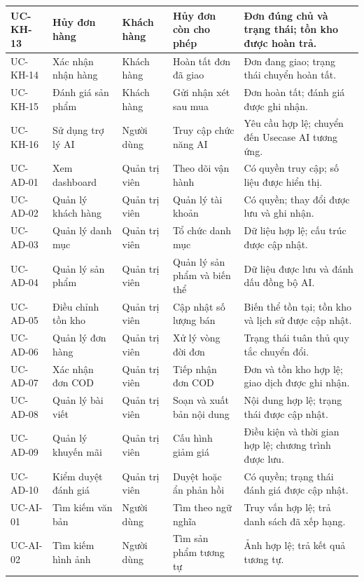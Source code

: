 \begin{longtable}{|p{}|p{}|p{}|p{}|p{}|}
    UC-KH-13 & Hủy đơn hàng & Khách hàng & Hủy đơn còn cho phép & Đơn đúng chủ và trạng thái; tồn kho được hoàn trả. \\ \hline
    UC-KH-14 & Xác nhận nhận hàng & Khách hàng & Hoàn tất đơn đã giao & Đơn đang giao; trạng thái chuyển hoàn tất. \\ \hline
    UC-KH-15 & Đánh giá sản phẩm & Khách hàng & Gửi nhận xét sau mua & Đơn hoàn tất; đánh giá được ghi nhận. \\ \hline
    UC-KH-16 & Sử dụng trợ lý AI & Người dùng & Truy cập chức năng AI & Yêu cầu hợp lệ; chuyển đến Usecase AI tương ứng. \\ \hline
    UC-AD-01 & Xem dashboard & Quản trị viên & Theo dõi vận hành & Có quyền truy cập; số liệu được hiển thị. \\ \hline
    UC-AD-02 & Quản lý khách hàng & Quản trị viên & Quản lý tài khoản & Có quyền; thay đổi được lưu và ghi nhận. \\ \hline
    UC-AD-03 & Quản lý danh mục & Quản trị viên & Tổ chức danh mục & Dữ liệu hợp lệ; cấu trúc được cập nhật. \\ \hline
    UC-AD-04 & Quản lý sản phẩm & Quản trị viên & Quản lý sản phẩm và biến thể & Dữ liệu được lưu và đánh dấu đồng bộ AI. \\ \hline
    UC-AD-05 & Điều chỉnh tồn kho & Quản trị viên & Cập nhật số lượng bán & Biến thể tồn tại; tồn kho và lịch sử được cập nhật. \\ \hline
    UC-AD-06 & Quản lý đơn hàng & Quản trị viên & Xử lý vòng đời đơn & Trạng thái tuân thủ quy tắc chuyển đổi. \\ \hline
    UC-AD-07 & Xác nhận đơn COD & Quản trị viên & Tiếp nhận đơn COD & Đơn và tồn kho hợp lệ; giao dịch được ghi nhận. \\ \hline
    UC-AD-08 & Quản lý bài viết & Quản trị viên & Soạn và xuất bản nội dung & Nội dung hợp lệ; trạng thái được cập nhật. \\ \hline
    UC-AD-09 & Quản lý khuyến mãi & Quản trị viên & Cấu hình giảm giá & Điều kiện và thời gian hợp lệ; chương trình được lưu. \\ \hline
    UC-AD-10 & Kiểm duyệt đánh giá & Quản trị viên & Duyệt hoặc ẩn phản hồi & Có quyền; trạng thái đánh giá được cập nhật. \\ \hline
    UC-AI-01 & Tìm kiếm văn bản & Người dùng & Tìm theo ngữ nghĩa & Truy vấn hợp lệ; trả danh sách đã xếp hạng. \\ \hline
    UC-AI-02 & Tìm kiếm hình ảnh & Người dùng & Tìm sản phẩm tương tự & Ảnh hợp lệ; trả kết quả tương tự. \\ \hline

\end{longtable}
